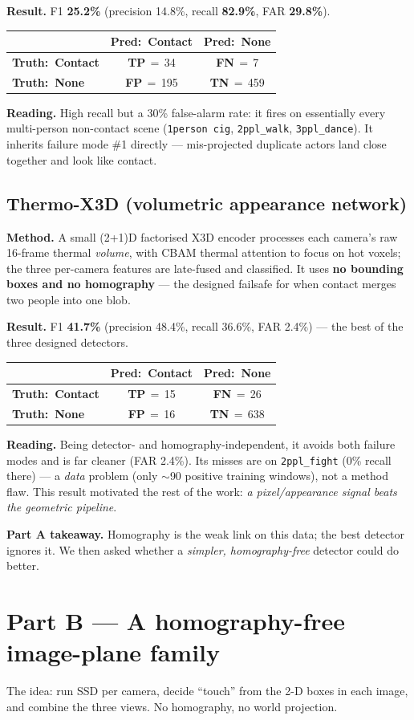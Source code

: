 \documentclass[11pt, a4paper]{article}
\newcommand{\confmat}[6]{%
    \vspace{2pt}\begin{center}\renewcommand{\arraystretch}{1.5}%
    \begin{tabular}{lcc}
        \hline\rule{0pt}{2.2ex}%
        & \textbf{Pred:\ #1} & \textbf{Pred:\ #2} \\[1pt]\hline\rule{0pt}{2.4ex}%
        \textbf{Truth:\ #1}
            & \cellcolor{cellgreenlight}\textcolor{tpgreen}{\textbf{TP}}\,$=$\,#3
            & \cellcolor{cellyellowlight}\textcolor{fnyellow}{\textbf{FN}}\,$=$\,#4 \\[3pt]
        \textbf{Truth:\ #2}
            & \cellcolor{cellredlight}\textcolor{fpred}{\textbf{FP}}\,$=$\,#5
            & \cellcolor{cellbluelight}\textcolor{tnblue}{\textbf{TN}}\,$=$\,#6 \\[1pt]\hline
    \end{tabular}\end{center}\vspace{2pt}}
\begin{document}
\textbf{Result.} F1 \textbf{25.2\%} (precision 14.8\%, recall \textbf{82.9\%},
FAR \textbf{29.8\%}).

\confmat{Contact}{None}{34}{7}{195}{459}

\textbf{Reading.} High recall but a 30\% false-alarm rate: it fires on essentially
every multi-person non-contact scene (\texttt{1person~cig}, \texttt{2ppl\_walk},
\texttt{3ppl\_dance}). It inherits failure mode \#1 directly --- mis-projected
duplicate actors land close together and look like contact.

\subsection{Thermo-X3D (volumetric appearance network)}
\label{sec:x3d}
\textbf{Method.} A small (2+1)D factorised X3D encoder processes each camera's
raw 16-frame thermal \emph{volume}, with CBAM thermal attention to focus on hot
voxels; the three per-camera features are late-fused and classified. It uses
\textbf{no bounding boxes and no homography} --- the designed failsafe for when
contact merges two people into one blob.

\textbf{Result.} F1 \textbf{41.7\%} (precision 48.4\%, recall 36.6\%, FAR 2.4\%)
--- the best of the three designed detectors.

\confmat{Contact}{None}{15}{26}{16}{638}

\textbf{Reading.} Being detector- and homography-independent, it avoids both
failure modes and is far cleaner (FAR 2.4\%). Its misses are on
\texttt{2ppl\_fight} (0\% recall there) --- a \emph{data} problem (only $\sim$90
positive training windows), not a method flaw. This result motivated the rest of
the work: \emph{a pixel/appearance signal beats the geometric pipeline}.

\medskip\noindent\textbf{Part A takeaway.} Homography is the weak link on this
data; the best detector ignores it. We then asked whether a \emph{simpler,
homography-free} detector could do better.

\section{Part B — A homography-free image-plane family}
The idea: run SSD per camera, decide ``touch'' from the 2-D boxes in each image,
and combine the three views. No homography, no world projection.
\end{document}
